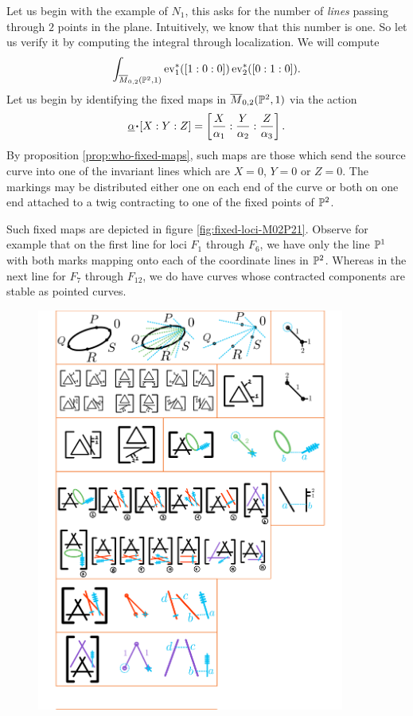 \documentclass[12pt]{memoir}
\begin{document}
\begin{Ex}\label{ex:N1-different-points}
    Let us begin with the example of $N_1$, this asks for the number of \emph{lines} passing through $2$ points in the plane. Intuitively, we know that this number is one. So let us verify it by computing the integral through localization. We will compute 
    $$\int_{\overline{M}_{0,2}(\mathbb{P}^2,1)}\operatorname{ev}_1^\ast([1:0:0])\operatorname{ev}_2^\ast([0:1:0]).$$
    Let us begin by identifying the fixed maps in $\overline{M}_{0,2}(\mathbb{P}^2,1)$ via the action 
    $$\un\al\.[X:Y:Z]=\bonj{\frac{X}{\al_1}:\frac{Y}{\al_2}:\frac{Z}{\al_3}}.$$
    By proposition \ref{prop:who-fixed-maps}, such maps are those which send the source curve into one of the invariant lines which are $X=0$, $Y=0$ or $Z=0$. The markings may be distributed either one on each end of the curve or both on one end attached to a twig contracting to one of the fixed points of $\mathbb{P}^2$.\par
    Such fixed maps are depicted in figure \ref{fig:fixed-loci-M02P21}. Observe for example that on the first line for loci $F_1$ through $F_6$, we have only the line $\mathbb{P}^1$ with both marks mapping onto each of the coordinate lines in $\mathbb{P}^2$. Whereas in the next line for $F_7$ through $F_{12}$, we do have curves whose contracted components are stable as pointed curves.
\begin{figure}[h!]
        \centering
        \includegraphics[width=0.9\textwidth, trim= 1.32cm 21cm 9.1cm 4.1cm,clip]{../figs/FigsDNnotability3.pdf}

\end{figure}
\end{Ex}
\end{document}
